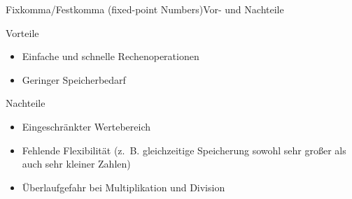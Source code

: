 \documentclass[xelatex,aspectratio=169]{beamer}
\begin{document}
\begin{frame}[t]{Fixkomma/Festkomma (fixed-point Numbers)}{Vor- und Nachteile}
  \begin{block}{Vorteile}
    \begin{itemize}
      \item Einfache und schnelle Rechenoperationen
      \item Geringer Speicherbedarf
    \end{itemize}
  \end{block}

  \begin{block}{Nachteile}
    \begin{itemize}
      \item Eingeschränkter Wertebereich
      \item Fehlende Flexibilität (z.~B. gleichzeitige Speicherung sowohl sehr großer als auch sehr kleiner Zahlen)
      \item Überlaufgefahr bei Multiplikation und Division
    \end{itemize}
  \end{block}
\end{frame}
\end{document}
